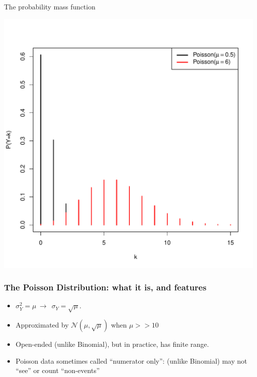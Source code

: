 \documentclass[10pt]{beamer}\usepackage[]{graphicx}\usepackage[]{color}
\makeatletter
\def\maxwidth{ %
  \ifdim\Gin@nat@width>\linewidth
    \linewidth
  \else
    \Gin@nat@width
  \fi
}
\newenvironment{knitrout}{}{} %
\makeatother
\begin{document}
\begin{frame}[fragile]{The probability mass function}
	
\begin{knitrout}\tiny
{}\color{fgcolor}

{\centering \includegraphics[width=\maxwidth]{figure/unnamed-chunk-12-1} 

}


\end{knitrout}
	
\end{frame}


\begin{frame}
	\frametitle{The Poisson Distribution: what it is, and features}
	
	\begin{itemize}
		\setlength\itemsep{2em}
		\item  $\sigma^2_Y =  \mu \ \to \ \ \sigma_Y =  \sqrt{\mu}.$ \pause
		\item  Approximated by $\mathcal{N}(\mu, \sqrt{\mu})$ when $\mu >> 10$ \pause 
		\item Open-ended (unlike Binomial), but in practice, has finite range. 
		
		\item Poisson data sometimes called ``numerator only'':  (unlike Binomial) may not ``see'' or  count ``non-events''
	\end{itemize}
\end{frame}
\end{document}

